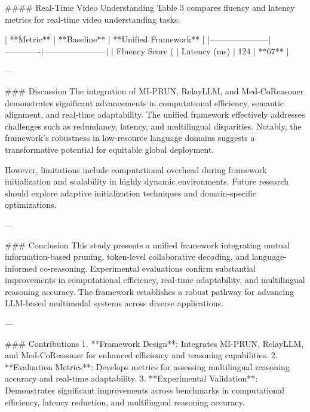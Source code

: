 #### Real-Time Video Understanding
Table 3 compares fluency and latency metrics for real-time video understanding tasks.

| **Metric**         | **Baseline** | **Unified Framework** |
|---------------------|-------------|-----------------------|
| Fluency Score (%
| Latency (ms)       | 124         | **67**               |

---

### Discussion
The integration of MI-PRUN, RelayLLM, and Med-CoReasoner demonstrates significant advancements in computational efficiency, semantic alignment, and real-time adaptability. The unified framework effectively addresses challenges such as redundancy, latency, and multilingual disparities. Notably, the framework’s robustness in low-resource language domains suggests a transformative potential for equitable global deployment.

However, limitations include computational overhead during framework initialization and scalability in highly dynamic environments. Future research should explore adaptive initialization techniques and domain-specific optimizations.

---

### Conclusion
This study presents a unified framework integrating mutual information-based pruning, token-level collaborative decoding, and language-informed co-reasoning. Experimental evaluations confirm substantial improvements in computational efficiency, real-time adaptability, and multilingual reasoning accuracy. The framework establishes a robust pathway for advancing LLM-based multimodal systems across diverse applications.

---

### Contributions
1. **Framework Design**: Integrates MI-PRUN, RelayLLM, and Med-CoReasoner for enhanced efficiency and reasoning capabilities.
2. **Evaluation Metrics**: Develops metrics for assessing multilingual reasoning accuracy and real-time adaptability.
3. **Experimental Validation**: Demonstrates significant improvements across benchmarks in computational efficiency, latency reduction, and multilingual reasoning accuracy.

